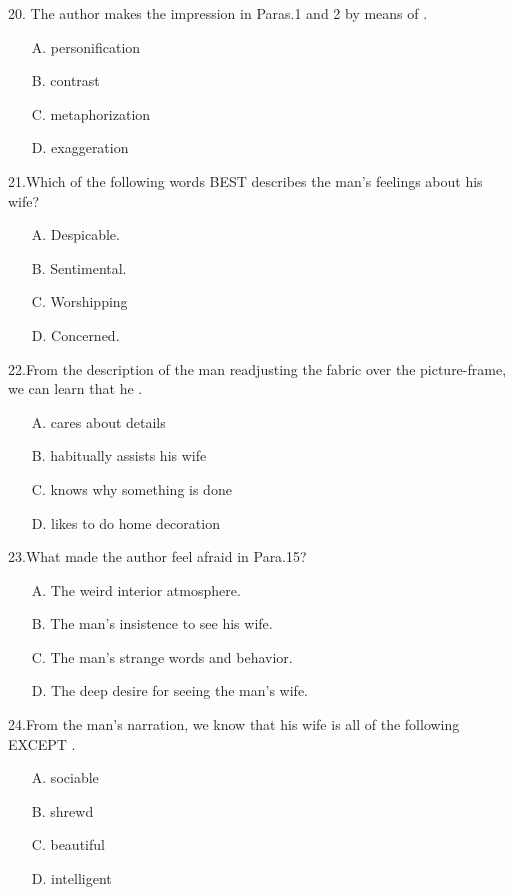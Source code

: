 \documentclass[UTF8,11pt]{ctexart}
\begin{document}
20. The author makes the impression in Paras.1 and 2 by means of .


\begin{itemize}[leftmargin=2em,itemsep=.2em,topsep=.4em]\item[A.] personification
\item[B.] contrast
\item[C.] metaphorization
\item[D.] exaggeration
\end{itemize}

21.Which of the following words BEST describes the man’s feelings about his wife?


\begin{itemize}[leftmargin=2em,itemsep=.2em,topsep=.4em]\item[A.] Despicable.
\item[B.] Sentimental.
\item[C.] Worshipping
\item[D.] Concerned.
\end{itemize}

22.From the description of the man readjusting the fabric over the picture-frame, we can learn that he .


\begin{itemize}[leftmargin=2em,itemsep=.2em,topsep=.4em]\item[A.] cares about details
\item[B.] habitually assists his wife
\item[C.] knows why something is done
\item[D.] likes to do home decoration
\end{itemize}

23.What made the author feel afraid in Para.15?


\begin{itemize}[leftmargin=2em,itemsep=.2em,topsep=.4em]\item[A.] The weird interior atmosphere.
\item[B.] The man’s insistence to see his wife.
\item[C.] The man’s strange words and behavior.
\item[D.] The deep desire for seeing the man’s wife.
\end{itemize}

24.From the man’s narration, we know that his wife is all of the following EXCEPT .


\begin{itemize}[leftmargin=2em,itemsep=.2em,topsep=.4em]\item[A.] sociable
\item[B.] shrewd
\item[C.] beautiful
\item[D.] intelligent
\end{itemize}
\end{document}
